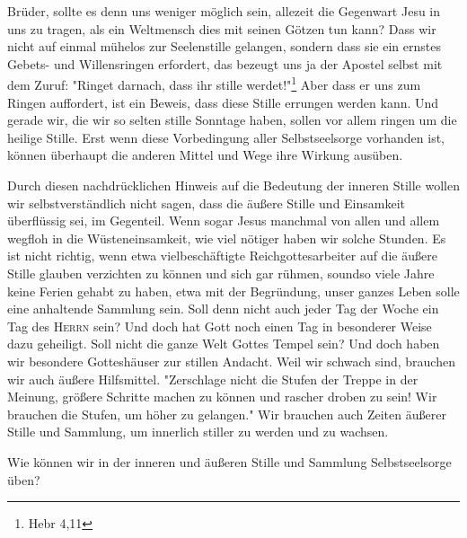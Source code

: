 \documentclass[a5paper,openany]{book}
\begin{document}
\par
Brüder, sollte es denn uns weniger möglich sein, allezeit die Gegenwart Jesu in uns zu tragen, als ein Weltmensch dies mit seinen Götzen tun kann? Dass wir nicht auf einmal mühelos zur Seelenstille gelangen, sondern dass sie ein ernstes Gebets- und Willensringen erfordert, das bezeugt uns ja der Apostel selbst mit dem Zuruf: "Ringet darnach, dass ihr stille werdet!"\footnote{Hebr 4,11} Aber dass er uns zum Ringen auffordert, ist ein Beweis, dass diese Stille errungen werden kann. Und gerade wir, die wir so selten stille Sonntage haben, sollen vor allem ringen um die heilige Stille. Erst wenn diese Vorbedingung aller Selbstseelsorge vorhanden ist, können überhaupt die anderen Mittel und Wege ihre Wirkung ausüben.
\par
Durch diesen nachdrücklichen Hinweis auf die Bedeutung der inneren Stille wollen wir selbstverständlich nicht sagen, dass die äußere Stille und Einsamkeit überflüssig sei, im Gegenteil. Wenn sogar Jesus manchmal von allen und allem wegfloh in die Wüsteneinsamkeit, wie viel nötiger haben wir solche Stunden. Es ist nicht richtig, wenn etwa vielbeschäftigte Reichgottesarbeiter auf die äußere Stille glauben verzichten zu können und sich gar rühmen, soundso viele Jahre keine Ferien gehabt zu haben, etwa mit der Begründung, unser ganzes Leben solle eine anhaltende Sammlung sein. Soll denn nicht auch jeder Tag der Woche ein Tag des \textsc{Herrn} sein? Und doch hat Gott noch einen Tag in besonderer Weise dazu geheiligt. Soll nicht die ganze Welt Gottes Tempel sein? Und doch haben wir besondere Gotteshäuser zur stillen Andacht. Weil wir schwach sind, brauchen wir auch äußere Hilfsmittel. "Zerschlage nicht die Stufen der Treppe in der Meinung, größere Schritte machen zu können und rascher droben zu sein! Wir brauchen die Stufen, um höher zu gelangen." Wir brauchen auch Zeiten äußerer Stille und Sammlung, um innerlich stiller zu werden und zu wachsen.
\par
Wie können wir in der inneren und äußeren Stille und Sammlung Selbstseelsorge üben?
\par
\end{document}
